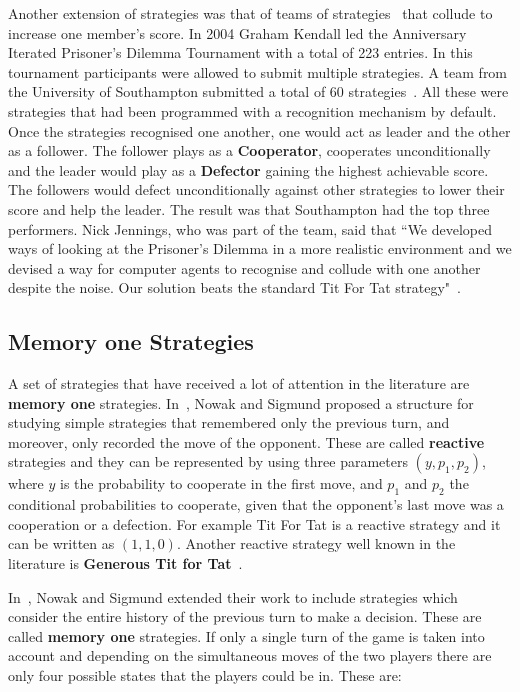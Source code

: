 Another extension of strategies was that of teams of
strategies~\cite{J.P.Delahaye1993Lp, J.P.Delahaye1995LIeP, A.Rogers2007Ctpw}
that collude to increase one member's score. In 2004 Graham Kendall led the
Anniversary Iterated Prisoner's Dilemma Tournament with a total of 223 entries.
In this tournament participants were allowed to submit multiple strategies. A
team from the University of Southampton submitted a total of 60
strategies~\cite{A.Rogers2007Ctpw}. All these were strategies that had been
programmed with a recognition mechanism by default. Once the strategies
recognised one another, one would act as leader and the other as a follower. The
follower plays as a \textbf{Cooperator}, cooperates unconditionally and the
leader would play as a \textbf{Defector} gaining the highest achievable score.
The followers would defect unconditionally against other strategies to lower
their score and help the leader. The result was that Southampton had the top
three performers. Nick Jennings, who was part of the team, said that ``We
developed ways of looking at the Prisoner's Dilemma in a more realistic
environment and we devised a way for computer agents to recognise and collude
with one another despite the noise. Our solution beats the standard Tit For Tat
strategy"~\cite{southampton_blog}.

\subsection{Memory one Strategies}\label{section:memory_one}

A set of strategies that have received a lot of attention in
the literature are \textbf{memory one} strategies. In~\cite{nowak1989},
Nowak and Sigmund proposed a structure for studying simple strategies that
remembered only the previous turn, and moreover, only recorded the move of the
opponent. These are called \textbf{reactive} strategies and they can be
represented by using three parameters \((y, p_1, p_2)\), where \(y\) is the
probability to cooperate in the first move, and \(p_1\) and \(p_2\) the
conditional probabilities to cooperate, given that the opponent's last move was
a cooperation or a defection. For example Tit For Tat is a reactive strategy and
it can be written as \((1, 1, 0)\). Another reactive strategy well known in
the literature is \textbf{Generous Tit for Tat}~\cite{Nowak1992}.

In~\cite{Nowak1990}, Nowak and Sigmund extended
their work to include strategies which consider the entire history of the previous turn to make a decision.
These are called \textbf{memory one} strategies.
If only a single turn of the game is taken into account and depending on the
simultaneous moves of the two players there are only four possible states that
the players could be in. These are:

